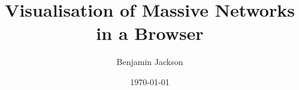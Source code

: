 \documentclass{l4proj}
\begin{document}
\title{Visualisation of Massive Networks in a Browser}
\author{Benjamin Jackson}
\date{\today}

\maketitle




\tableofcontents

\pagebreak
{}














\end{document}
